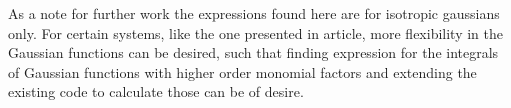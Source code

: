     As a note for further work the expressions found here are for isotropic
    gaussians only. For certain systems, like the one presented in
    article\cite{nonIsoGauss}, more flexibility in the Gaussian functions can
    be desired, such that finding expression for the integrals of Gaussian
    functions with higher order monomial factors and extending the existing
    code to calculate those can be of desire.
